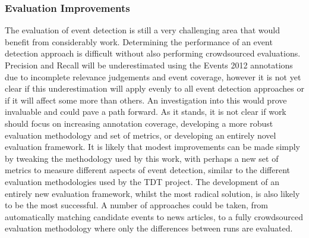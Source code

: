 \subsubsection{Evaluation Improvements}
The evaluation of event detection is still a very challenging area that would benefit from considerably work.
Determining the performance of an event detection approach is difficult without also performing crowdsourced evaluations.
Precision and Recall will be underestimated using the Events 2012 annotations due to incomplete relevance judgements and event coverage, however it is not yet clear if this underestimation will apply evenly to all event detection approaches or if it will affect some more than others.
An investigation into this would prove invaluable  and could pave a path forward.
As it stands, it is not clear if work should focus on increasing annotation coverage, developing a more robust evaluation methodology and set of metrics, or developing an entirely novel evaluation framework.
It is likely that modest improvements can be made simply by tweaking the methodology used by this work, with perhaps a new set of metrics to measure different aspects of event detection, similar to the different evaluation methodologies used by the TDT project.
The development of an entirely new evaluation framework, whilst the most radical solution, is also likely to be the most successful.
A number of approaches could be taken, from automatically matching candidate events to news articles, to a fully crowdsourced evaluation methodology where only the differences between runs are evaluated.

